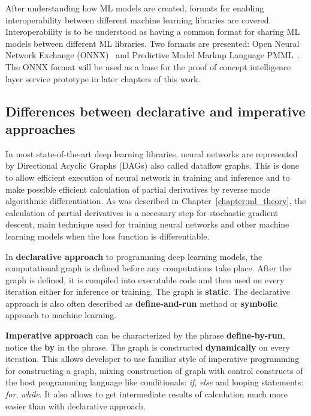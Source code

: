 \documentclass[english, 12pt, a4paper, elec, utf8, online]{aaltothesis}
\begin{document}
After understanding how ML models are created, formats for enabling interoperability between different machine learning libraries are covered. Interoperability is to be understood as having a common format for sharing ML models between different ML libraries. Two formats are presented: Open Neural Network Exchange (ONNX)~\cite{hazelwood2018applied} and Predictive Model Markup Language PMML~\cite{guazzelli2009pmml}. The ONNX format will be used as a base for the proof of concept intelligence layer service prototype in later chapters of this work.

\subsection{Differences between declarative and imperative approaches}\label{subsec:dec_vs_imp}
In most state-of-the-art deep learning libraries, neural networks are represented by Directional Acyclic Graphs (DAGs) also called dataflow graphs. This is done to allow efficient execution of neural network in training and inference and to make possible efficient calculation of partial derivatives by reverse mode algorithmic differentiation. As was described in Chapter~\ref{chapter:ml_theory}, the calculation of partial derivatives is a necessary step for stochastic gradient descent, main technique used for training neural networks and other machine learning models when the loss function is differentiable.

In \textbf{declarative approach} to programming deep learning models, the computational graph is defined before any computations take place. After the graph is defined, it is compiled into executable code and then used on every iteration either for inference or training. The graph is \textbf{static}. The declarative approach is also often described as \textbf{define-and-run} method or \textbf{symbolic} approach to machine learning.

\textbf{Imperative approach} can be characterized by the phrase \textbf{define-by-run}, notice the \textbf{by} in the phrase. The graph is constructed \textbf{dynamically} on every iteration. This allows developer to use familiar style of imperative programming for constructing a graph, mixing construction of graph with control constructs of the host programming language like conditionals: \textit{if}, \textit{else} and looping statements: \textit{for}, \textit{while}. It also allows to get intermediate results of calculation much more easier than with declarative approach.
\end{document}
